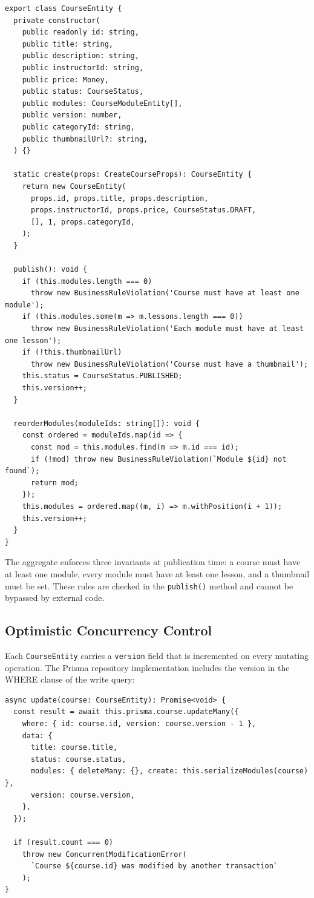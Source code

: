 \begin{lstlisting}[caption=Course Aggregate Root,label=lst:course-aggregate]
export class CourseEntity {
  private constructor(
    public readonly id: string,
    public title: string,
    public description: string,
    public instructorId: string,
    public price: Money,
    public status: CourseStatus,
    public modules: CourseModuleEntity[],
    public version: number,
    public categoryId: string,
    public thumbnailUrl?: string,
  ) {}

  static create(props: CreateCourseProps): CourseEntity {
    return new CourseEntity(
      props.id, props.title, props.description,
      props.instructorId, props.price, CourseStatus.DRAFT,
      [], 1, props.categoryId,
    );
  }

  publish(): void {
    if (this.modules.length === 0)
      throw new BusinessRuleViolation('Course must have at least one module');
    if (this.modules.some(m => m.lessons.length === 0))
      throw new BusinessRuleViolation('Each module must have at least one lesson');
    if (!this.thumbnailUrl)
      throw new BusinessRuleViolation('Course must have a thumbnail');
    this.status = CourseStatus.PUBLISHED;
    this.version++;
  }

  reorderModules(moduleIds: string[]): void {
    const ordered = moduleIds.map(id => {
      const mod = this.modules.find(m => m.id === id);
      if (!mod) throw new BusinessRuleViolation(`Module ${id} not found`);
      return mod;
    });
    this.modules = ordered.map((m, i) => m.withPosition(i + 1));
    this.version++;
  }
}
\end{lstlisting}

The aggregate enforces three invariants at publication time: a course must have at least one module, every module must have at least one lesson, and a thumbnail must be set. These rules are checked in the \texttt{publish()} method and cannot be bypassed by external code.

\subsection{Optimistic Concurrency Control}

Each \texttt{CourseEntity} carries a \texttt{version} field that is incremented on every mutating operation. The Prisma repository implementation includes the version in the WHERE clause of the write query:

\begin{lstlisting}[caption=Optimistic Concurrency Update,label=lst:optimistic-lock]
async update(course: CourseEntity): Promise<void> {
  const result = await this.prisma.course.updateMany({
    where: { id: course.id, version: course.version - 1 },
    data: {
      title: course.title,
      status: course.status,
      modules: { deleteMany: {}, create: this.serializeModules(course) },
      version: course.version,
    },
  });

  if (result.count === 0)
    throw new ConcurrentModificationError(
      `Course ${course.id} was modified by another transaction`
    );
}
\end{lstlisting}

